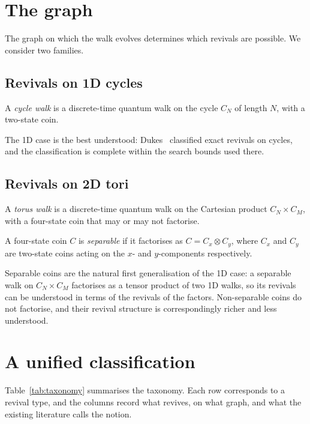 \section{The graph}
The graph on which the walk evolves determines which revivals are possible.
We consider two families.

\subsection{Revivals on 1D cycles}
\begin{definition}\label{def:cycle-walk}
A \emph{cycle walk} is a discrete-time quantum walk on the cycle $C_N$ of
length $N$, with a two-state coin.
\end{definition}
The 1D case is the best understood: Dukes~\cite{Dukes2014} classified exact
revivals on cycles, and the classification is complete within the search
bounds used there.

\subsection{Revivals on 2D tori}
\begin{definition}\label{def:torus-walk}
A \emph{torus walk} is a discrete-time quantum walk on the Cartesian
product $C_N \times C_M$, with a four-state coin that may or may not
factorise.
\end{definition}
\begin{definition}\label{def:separable-coin}
A four-state coin $C$ is \emph{separable} if it factorises as
$C = C_x \otimes C_y$, where $C_x$ and $C_y$ are two-state coins acting on
the $x$- and $y$-components respectively.
\end{definition}
Separable coins are the natural first generalisation of the 1D case: a
separable walk on $C_N \times C_M$ factorises as a tensor product of two 1D
walks, so its revivals can be understood in terms of the revivals of the
factors. Non-separable coins do not factorise, and their revival structure
is correspondingly richer and less understood.

\section{A unified classification}
Table~\ref{tab:taxonomy} summarises the taxonomy. Each row corresponds to a
revival type, and the columns record what revives, on what graph, and what
the existing literature calls the notion.

